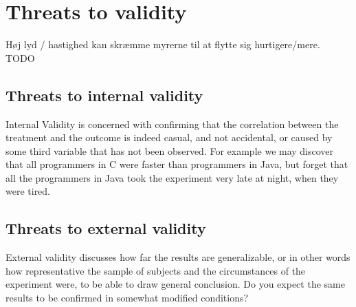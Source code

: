 
\section{Threats to validity}

Høj lyd / hastighed kan skræmme myrerne til at flytte sig hurtigere/mere.
TODO

\subsection{Threats to internal validity}
Internal Validity is concerned with confirming that the correlation between the treatment and the outcome is indeed casual, and not accidental, or caused by some third variable that has not been observed. For example we may discover that all programmers in C were faster than programmers in Java, but forget that all the programmers in Java took the experiment very late at night, when they were tired.

\subsection{Threats to external validity}
External validity discusses how far the results are generalizable, or in other words how representative the sample of subjects and the circumstances of the experiment were, to be able to draw general conclusion. Do you expect the same results to be confirmed in somewhat modified conditions?
